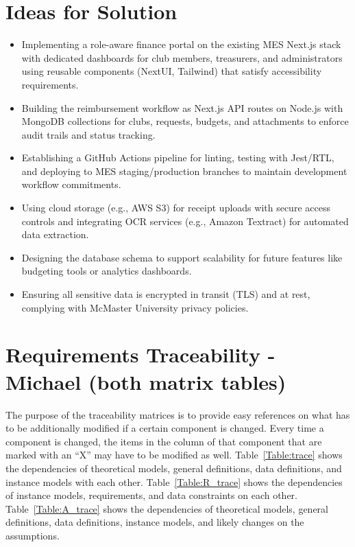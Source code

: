 \documentclass[12pt]{article}
\begin{document}
\section{Ideas for Solution}
  \begin{itemize}
    \item Implementing a role-aware finance portal on the existing MES Next.js stack with dedicated dashboards for club members, treasurers, and administrators using reusable components (NextUI, Tailwind) that satisfy accessibility requirements.
    \item Building the reimbursement workflow as Next.js API routes on Node.js with MongoDB collections for clubs, requests, budgets, and attachments to enforce audit trails and status tracking.
    \item Establishing a GitHub Actions pipeline for linting, testing with Jest/RTL, and deploying to MES staging/production branches to maintain development workflow commitments.
    \item Using cloud storage (e.g., AWS S3) for receipt uploads with secure access controls and integrating OCR services (e.g., Amazon Textract) for automated data extraction.
    \item Designing the database schema to support scalability for future features like budgeting tools or analytics dashboards.
    \item Ensuring all sensitive data is encrypted in transit (TLS) and at rest, complying with McMaster University privacy policies.
  \end{itemize}

\section{Requirements Traceability - Michael (both matrix tables)}

The purpose of the traceability matrices is to provide easy references on what
has to be additionally modified if a certain component is changed.  Every time a
component is changed, the items in the column of that component that are marked
with an ``X'' may have to be modified as well.  Table~\ref{Table:trace} shows the
dependencies of theoretical models, general definitions, data definitions, and
instance models with each other. Table~\ref{Table:R_trace} shows the
dependencies of instance models, requirements, and data constraints on each
other. Table~\ref{Table:A_trace} shows the dependencies of theoretical models,
general definitions, data definitions, instance models, and likely changes on
the assumptions.
\end{document}
